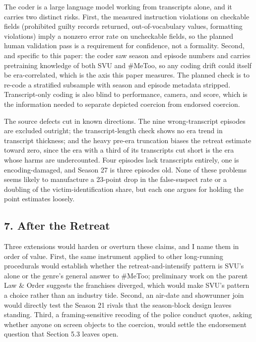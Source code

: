 \documentclass[
]{article}
\begin{document}
The coder is a large language model working from transcripts alone, and
it carries two distinct risks. First, the measured instruction
violations on checkable fields (prohibited guilty records returned,
out-of-vocabulary values, formatting violations) imply a nonzero error
rate on uncheckable fields, so the planned human validation pass is a
requirement for confidence, not a formality. Second, and specific to
this paper: the coder saw season and episode numbers and carries
pretraining knowledge of both SVU and \#MeToo, so any coding drift could
itself be era-correlated, which is the axis this paper measures. The
planned check is to re-code a stratified subsample with season and
episode metadata stripped. Transcript-only coding is also blind to
performance, camera, and score, which is the information needed to
separate depicted coercion from endorsed coercion.

The source defects cut in known directions. The nine wrong-transcript
episodes are excluded outright; the transcript-length check shows no era
trend in transcript thickness; and the heavy pre-era truncation biases
the retreat estimate toward zero, since the era with a third of its
transcripts cut short is the era whose harms are undercounted. Four
episodes lack transcripts entirely, one is encoding-damaged, and Season
27 is three episodes old. None of these problems seems likely to
manufacture a 23-point drop in the false-suspect rate or a doubling of
the victim-identification share, but each one argues for holding the
point estimates loosely.

\subsection{7. After the Retreat}\label{after-the-retreat}

Three extensions would harden or overturn these claims, and I name them
in order of value. First, the same instrument applied to other
long-running procedurals would establish whether the
retreat-and-intensify pattern is SVU's alone or the genre's general
answer to \#MeToo; preliminary work on the parent Law \& Order suggests
the franchises diverged, which would make SVU's pattern a choice rather
than an industry tide. Second, an air-date and showrunner join would
directly test the Season 21 rivals that the season-block design leaves
standing. Third, a framing-sensitive recoding of the police conduct
quotes, asking whether anyone on screen objects to the coercion, would
settle the endorsement question that Section 5.3 leaves open.
\end{document}
